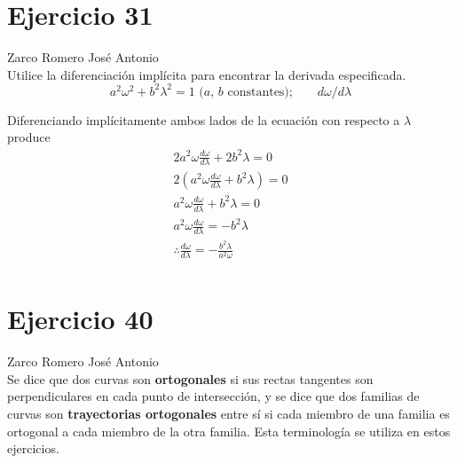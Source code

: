 \documentclass[12pt]{article}
\begin{document}
\section{Ejercicio 31} Zarco Romero José Antonio \\

Utilice la diferenciación implícita para encontrar la derivada especificada.
\[ a^2 \omega^2 + b^2 \lambda^2 = 1 \text{ ($a$, $b$ constantes);}\qquad d\omega /d\lambda \]

Diferenciando implícitamente ambos lados de la ecuación con respecto a $\lambda$ produce
\begin{align*}
  2a^2\omega \frac{d\omega}{d\lambda}+2b^2\lambda=0\\
  2(a^2\omega \frac{d\omega}{d\lambda}+b^2\lambda)=0\\
  a^2\omega \frac{d\omega}{d\lambda}+b^2\lambda=0\\
  a^2\omega \frac{d\omega}{d\lambda}=-b^2\lambda\\
  \therefore \frac{d\omega}{d\lambda}=-\frac{b^2\lambda}{a^2\omega}\\
\end{align*}

\section{Ejercicio 40} Zarco Romero José Antonio \\

Se dice que dos curvas son \textbf{ortogonales} si sus rectas tangentes son perpendiculares en cada punto de intersección, y se dice que dos familias de curvas son \textbf{trayectorias ortogonales} entre sí si cada miembro de una familia es ortogonal a cada miembro de la otra familia. Esta terminología se utiliza en estos ejercicios.
\end{document}
